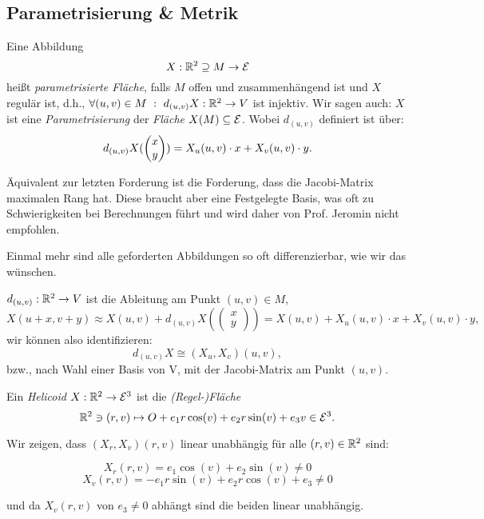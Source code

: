 \subsection{Parametrisierung \& Metrik}
\begin{definition}
	

Eine Abbildung \[ X:\mathbb R^2 \supseteq M \rightarrow \mathcal E \] heißt \emph{parametrisierte Fläche}, falls $M$ offen und zusammenhängend ist und $X$ regulär ist, d.h., $  \forall(u,v) \in M~:~d_{(u,v)}X: \mathbb R^2 \rightarrow V $ ist injektiv.
Wir sagen auch: $  X  $ ist eine \emph{Parametrisierung} der \emph{Fläche} $ X(M) \subseteq \mathcal E $.
Wobei $ d_{(u,v)} $ definiert ist über:
	\[d_{(u,v)}X(\begin{pmatrix} x \\y \end{pmatrix})= X_u(u,v)\cdot x + X_v(u,v) \cdot y. \]

\end{definition}

\begin{remark}
	
 Äquivalent zur letzten Forderung ist die Forderung, dass die Jacobi-Matrix maximalen Rang hat. Diese braucht aber eine Festgelegte Basis, was oft zu Schwierigkeiten bei Berechnungen führt und wird daher von Prof. Jeromin nicht empfohlen.

\end{remark}

\begin{remark}
	Einmal mehr sind alle geforderten Abbildungen so oft differenzierbar, wie wir das wünschen.
\end{remark}

\begin{remark}
	
	$ d_{(u,v)} : \mathbb R^2 \rightarrow V$ ist die Ableitung am Punkt $ (u,v) \in M $, \[X(u+x,v+y) \approx X(u,v) + d_{(u,v)}  X(\begin{pmatrix}
	x\\
	y
	\end{pmatrix}) = X(u,v) + X_u(u,v)\cdot x + X_v(u,v)\cdot y,  \]
	wir können also identifizieren: \[ d_{(u,v)}X \cong (X_u,X_v)(u,v), \]
	bzw., nach Wahl einer Basis von V, mit der Jacobi-Matrix am Punkt $ (u,v) $.
	
\end{remark}

\begin{example}
	


Ein \emph{Helicoid} $ X: \mathbb R^2 \rightarrow \mathcal E^3 $ ist die \emph{(Regel-)Fläche}  
\[ \mathbb R^2 \ni (r,v) \mapsto O + e_1r \cos(v) + e_2 r \sin(v) + e_3 v \in \mathcal E^3. \]

Wir zeigen, dass $(X_r,X_v)(r,v)$ linear unabhängig für alle $ (r,v) \in \mathbb R^2 $ sind:

\[ X_r(r,v) = e_1\cos(v) + e_2 \sin(v) \neq 0 \]
\[ X_v(r,v) = -e_1r \sin(v) + e_2 r \cos(v) + e_3 \neq 0 \]

und da $ X_v(r,v) $ von $e_3 \neq 0$  abhängt sind die beiden linear unabhängig.

\end{example}

